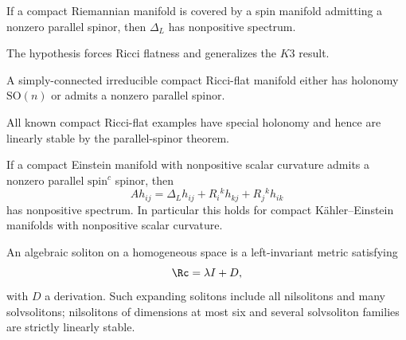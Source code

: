 \begin{theorem}
\label{thm:chow-iv-parallel-spinor-stability}
If a compact Riemannian manifold is covered by a spin manifold admitting a
nonzero parallel spinor, then $\Delta_L$ has nonpositive spectrum.
\end{theorem}

\begin{remark}
\label{rem:chow-iv-parallel-spinor-rigidity}
The hypothesis forces Ricci flatness and generalizes the $K3$ result.
\end{remark}

\begin{proposition}
\label{prop:chow-iv-ricci-flat-holonomy}
A simply-connected irreducible compact Ricci-flat manifold either has holonomy
$\mathrm{SO}(n)$ or admits a nonzero parallel spinor.
\end{proposition}

\begin{remark}
\label{rem:chow-iv-known-ricci-flat-stability}
All known compact Ricci-flat examples have special holonomy and hence are
linearly stable by the parallel-spinor theorem.
\end{remark}

\begin{theorem}
\label{thm:chow-iv-spinc-linear-stability}
If a compact Einstein manifold with nonpositive scalar curvature admits a
nonzero parallel $\mathrm{spin}^c$ spinor, then
\[
 Ah_{ij}=\Delta_Lh_{ij}+R_i{}^kh_{kj}+R_j{}^kh_{ik}
\]
has nonpositive spectrum.  In particular this holds for compact
K\"ahler--Einstein manifolds with nonpositive scalar curvature.
\end{theorem}

An algebraic soliton on a homogeneous space is a left-invariant metric satisfying
\[
 \Rc=\lambda I+D,
\]
with $D$ a derivation.  Such expanding solitons include all nilsolitons and
many solvsolitons; nilsolitons of dimensions at most six and several
solvsoliton families are strictly linearly stable.

